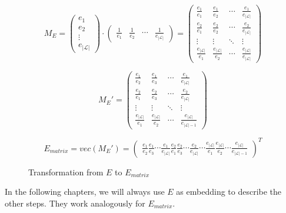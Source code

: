 \begin{figure}[h]
	\centering
	$$ M_E = \begin{pmatrix}
		e_1\\
        e_2\\
        \vdots\\
        e_{|\mathcal{L}|}
     \end{pmatrix}
     \cdot
     \begin{pmatrix}
     	\frac{1}{e_1} & \frac{1}{e_2} & \cdots & \frac{1}{e_{|\mathcal{L}|}}
     \end{pmatrix} = 
	 \begin{pmatrix}
		\frac{e_1}{e_1} & \frac{e_1}{e_2} & \cdots & \frac{e_1}{e_{|\mathcal{L}|}}\\
        \frac{e_2}{e_1} & \frac{e_2}{e_2} & \cdots & \frac{e_2}{e_{|\mathcal{L}|}}\\
        \vdots & \vdots & \ddots & \vdots\\
        \frac{e_{|\mathcal{L}|}}{e_1} & \frac{e_{|\mathcal{L}|}}{e_2} & \cdots & \frac{e_{|\mathcal{L}|}}{e_{|\mathcal{L}|}}
     \end{pmatrix}     
     $$
     
     $$
	 M_E' =   
	 \begin{pmatrix}
		\frac{e_1}{e_2} & \frac{e_1}{e_3} & \cdots & \frac{e_1}{e_{|\mathcal{L}|}}\\
        \frac{e_2}{e_1} & \frac{e_2}{e_3} & \cdots & \frac{e_2}{e_{|\mathcal{L}|}}\\
        \vdots & \vdots & \ddots & \vdots\\
        \frac{e_{|\mathcal{L}|}}{e_1} & \frac{e_{|\mathcal{L}|}}{e_2} & \cdots & \frac{e_{|\mathcal{L}|}}{e_{|\mathcal{L}|-1}}
     \end{pmatrix}  
     $$
     
     $$
     E_{matrix} = vec(M_E') = 
     \begin{pmatrix}
     	\frac{e_1}{e_2}  \frac{e_1}{e_3}  \cdots  \frac{e_1}{e_{|\mathcal{L}|}}  \frac{e_2}{e_1}  \frac{e_2}{e_3}  \cdots \frac{e_2}{e_{|\mathcal{L}|}}  \cdots  \frac{e_{|\mathcal{L}|}}{e_1} \frac{e_{|\mathcal{L}|}}{e_2}  \cdots  \frac{e_{|\mathcal{L}|}}{e_{|\mathcal{L}|-1}}
     \end{pmatrix}^T
     $$
     
	\caption{Transformation from $E$ to $E_{matrix}$}%
	\label{fig:transform1}
\end{figure}

In the following chapters, we will always use $E$ as embedding to describe the other steps. They work analogously for $E_{matrix}$.

